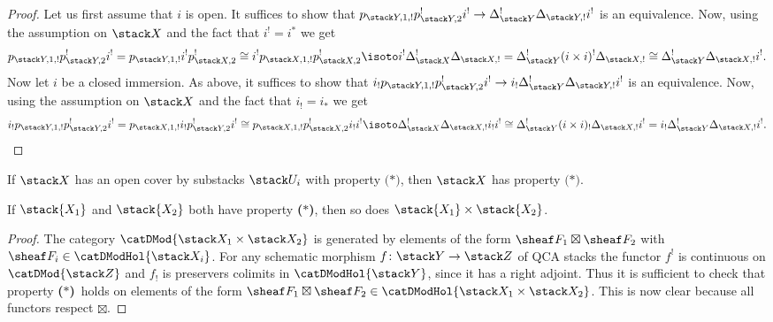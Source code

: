 \documentclass{ck-article}
\newcommand\bc{\textbf{($\mathbf{*}$)}}
\begin{document}
\begin{proof}
    Let us first assume that $i$ is open.
    It suffices to show that $p_{\stack Y,1,!}p_{\stack Y,2}^!i^! \to \Delta_{\stack Y}^!\Delta_{\stack Y,!}i^!$ is an equivalence.
    Now, using the assumption on $\stack X$ and the fact that $i^! = i^*$ we get
    \[
        p_{\stack Y,1,!} p_{\stack Y,2}^!i^! =
        p_{\stack Y,1,!} i^! p_{\stack X,2}^! \cong
        i^! p_{\stack X,1,!} p_{\stack X,2}^! \isoto
        i^! \Delta_{\stack X}^! \Delta_{\stack X,!} =
        \Delta_{\stack Y}^! (i\times i)^! \Delta_{\stack X,!} \cong
        \Delta_{\stack Y}^! \Delta_{\stack X,!} i^!.
    \]
    Now let $i$ be a closed immersion.
    As above, it suffices to show that $i_!p_{\stack Y,1,!}p_{\stack Y,2}^!i^! \to i_!\Delta_{\stack Y}^!\Delta_{\stack Y,!}i^!$ is an equivalence.
    Now, using the assumption on $\stack X$ and the fact that $i_! = i_*$ we get
    \[
        i_! p_{\stack Y,1,!} p_{\stack Y,2}^!i^! =
        p_{\stack X,1,!} i_! p_{\stack Y,2}^!i^! \cong
        p_{\stack X,1,!} p_{\stack X,2}^! i_!i^! \isoto
        \Delta_{\stack X}^! \Delta_{\stack X,!} i_!i^! \cong
        \Delta_{\stack Y}^! (i\times i)_! \Delta_{\stack X,!}i^! =
        i_! \Delta_{\stack Y}^! \Delta_{\stack X,!} i^!.
        \qedhere
    \]

\end{proof}

\begin{Lem}\label{lem:bc_open_cover}
    If $\stack X$ has an open cover by substacks $\stack U_i$ with property $\bc$, then $\stack X$ has property $\bc$.
\end{Lem}

\begin{Lem}\label{lem:bc_product}
    If $\stack{X_1}$ and $\stack{X_2}$ both have property \bc, then so does $\stack{X_1} \times \stack{X_2}$.
\end{Lem}

\begin{proof}
    The category $\catDMod{\stack X_1 \times \stack X_2}$ is generated by elements of the form $\sheaf F_1 \boxtimes \sheaf F_2$ with $\sheaf F_i \in \catDModHol{\stack X_i}$.
    For any schematic morphism $f\colon \stack Y \to \stack Z$ of QCA stacks the functor $f^!$ is continuous on $\catDMod{\stack Z}$ and $f_!$ is preservers colimits in $\catDModHol{\stack Y}$, since it has a right adjoint.
    Thus it is sufficient to check that property \bc\ holds on elements of the form $\sheaf F_1 \boxtimes \sheaf F_2 \in \catDModHol{\stack X_1 \times \stack X_2}$.
    This is now clear because all functors respect $\boxtimes$.
\end{proof}
\end{document}
